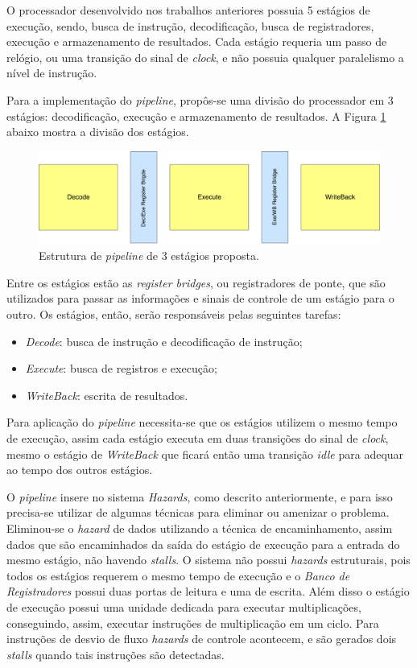 \documentclass[11pt,a4paper,titlepage]{article}
\begin{document}
O processador desenvolvido nos trabalhos anteriores possuia 5 estágios de execução, sendo, busca de instrução, decodificação, busca de registradores, execução e armazenamento de resultados. Cada estágio requeria um passo de relógio, ou uma transição do sinal de \textit{clock}, e não possuia qualquer paralelismo a nível de instrução.

Para a implementação do \textit{pipeline}, propôs-se uma divisão do processador em 3 estágios: decodificação, execução e armazenamento de resultados. A Figura \ref{fig:pipeline3stage} abaixo mostra a divisão dos estágios.

\begin{figure}[!h]
\centering
\includegraphics[scale=0.4]{images/pipeline.pdf}
\caption{Estrutura de \textit{pipeline} de 3 estágios proposta.}
\label{fig:pipeline3stage}
\end{figure}

Entre os estágios estão as \textit{register bridges}, ou registradores de ponte, que são utilizados para passar as informações e sinais de controle de um estágio para o outro. Os estágios, então, serão responsáveis pelas seguintes tarefas:

\begin{itemize}
\item \textit{Decode}: busca de instrução e decodificação de instrução;
\item \textit{Execute}: busca de registros e execução;
\item \textit{WriteBack}: escrita de resultados.
\end{itemize}

Para aplicação do \textit{pipeline} necessita-se que os estágios utilizem o mesmo tempo de execução, assim cada estágio executa em duas transições do sinal de \textit{clock}, mesmo o estágio de \textit{WriteBack} que ficará então uma transição \textit{idle} para adequar ao tempo dos outros estágios.

O \textit{pipeline} insere no sistema \textit{Hazards}, como descrito anteriormente, e para isso precisa-se utilizar de algumas técnicas para eliminar ou amenizar o problema. Eliminou-se o \textit{hazard} de dados utilizando a técnica de encaminhamento, assim dados que são encaminhados da saída do estágio de execução para a entrada do mesmo estágio, não havendo \textit{stalls}. O sistema não possui \textit{hazards} estruturais, pois todos os estágios requerem o mesmo tempo de execução e o \textit{Banco de Registradores} possui duas portas de leitura e uma de escrita. Além disso o estágio de execução possui uma unidade dedicada para executar multiplicações, conseguindo, assim, executar instruções de multiplicação em um ciclo. Para instruções de desvio de fluxo \textit{hazards} de controle acontecem, e são gerados dois \textit{stalls} quando tais instruções são detectadas.
\end{document}
